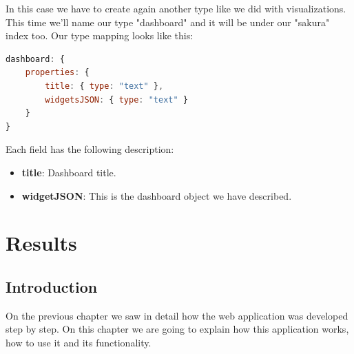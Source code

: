 \documentclass[a4paper, 12pt, english]{book}
\begin{document}
In this case we have to create again another type like we did with visualizations. This time we'll name our type "dashboard" and it will be under our "sakura" index too. Our type mapping looks like this:
\begin{lstlisting}[language=javascript, caption=Elasticsearch "dashboard" type mapping, label=code:dashboard-type-mapping]
dashboard: {
    properties: {
        title: { type: "text" },
        widgetsJSON: { type: "text" }
    }
}
\end{lstlisting}

Each field has the following description:
\begin{itemize}
    \item \textbf{title}: Dashboard title.
    \item \textbf{widgetJSON}: This is the dashboard object we have described.
\end{itemize}








\cleardoublepage
\chapter{Results}
\section{Introduction}
\label{sec:results-introduction}
On the previous chapter we saw in detail how the web application was developed step by step. On this chapter we are going to explain how this application works, how to use it and its functionality.
\end{document}
